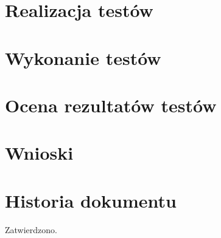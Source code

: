 \documentclass[10pt]{dokument-tiwo}
\begin{document}
\section{Realizacja testów}


\section{Wykonanie testów}


\section{Ocena rezultatów testów}


\section{Wnioski}


\newpage
\section*{Historia dokumentu}
\begin{versions}
        Zatwierdzono.
\end{versions}
\end{document}
